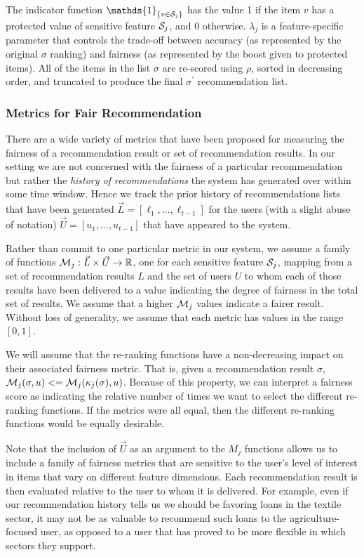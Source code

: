 \noindent The indicator function $\mathds{1}_{\{v \in \sensitive_j\}}$ has the value 1 if the item $v$ has a protected value of sensitive feature $\mathcal{S}_j$, and 0 otherwise. $\lambda_j$ is a feature-specific parameter that controls the trade-off between accuracy (as represented by the original $\sigma$ ranking) and fairness (as represented by the boost given to protected items). All of the items in the list $\sigma$ are re-scored using $\rho$, sorted in decreasing order, and truncated to produce the final $\sigma^{\prime}$ recommendation list.

\subsubsection{\textbf{Metrics for Fair Recommendation}}
\hfill

There are a wide variety of metrics that have been proposed for measuring the fairness of a recommendation result or set of recommendation results.  In our setting we are not concerned with the fairness of a particular recommendation but rather the \emph{history of recommendations} the system has generated over within some time window.  Hence we track the prior history of recommendations lists that have been generated $\vec{L} = [\ell_1, \ldots, \ell_{t-1}]$ for the users (with a slight abuse of notation) $\vec{U} = [u_1, \ldots, u_{t-1} ]$ that have appeared to the system.  

Rather than commit to one particular metric in our system, we assume a family of functions $\mathcal{M}_j: \vec{L} \times \vec{U} \rightarrow \mathbb{R}$, one for each sensitive feature $\mathcal{S}_j$, mapping from a set of recommendation results $L$ and the set of users $U$ to whom each of those results have been delivered to a value indicating the degree of fairness in the total set of results. We assume that a higher $\mathcal{M}_j$ values indicate a fairer result. Without loss of generality, we assume that each metric has values in the range $[0,1]$.

We will assume that the re-ranking functions have a non-decreasing impact on their associated fairness metric. That is, given a recommendation result $\sigma$, $\mathcal{M}_j(\sigma, u) <=  \mathcal{M}_j(\kappa_j(\sigma), u)$.  Because of this property, we can interpret a fairness score as indicating the relative number of times we want to select the different re-ranking functions. If the metrics were all equal, then the different re-ranking functions would be equally desirable.

Note that the inclusion of $\vec{U}$ as an argument to the $M_j$ functions allows us to include a family of fairness metrics that are sensitive to the user's level of interest in items that vary on different feature dimensions. Each recommendation result is then evaluated relative to the user to whom it is delivered. For example, even if our recommendation history tells us we should be favoring loans in the textile sector, it may not be as valuable to recommend such loans to the agriculture-focused user, as opposed to a user that has proved to be more flexible in which sectors they support.

